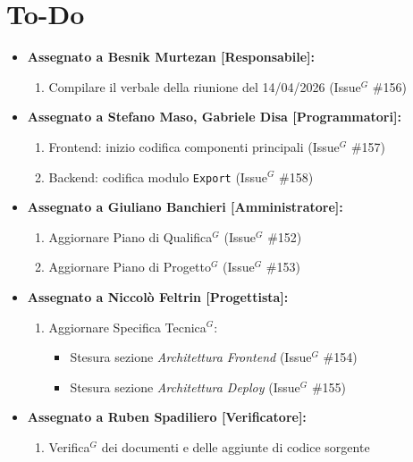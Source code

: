 \documentclass[a4paper,10pt]{article}
\begin{document}
\section*{To-Do}
\begin{itemize}
\item \textbf{Assegnato a Besnik Murtezan [Responsabile]:}
    \begin{enumerate}
    \item Compilare il verbale della riunione del 14/04/2026 (Issue$^G$ \#156)
    \end{enumerate}
\item \textbf{Assegnato a Stefano Maso, Gabriele Disa [Programmatori]:}
    \begin{enumerate}
    \item Frontend: inizio codifica componenti principali (Issue$^G$ \#157)
    \item Backend: codifica modulo \texttt{Export} (Issue$^G$ \#158)
  \end{enumerate}
\item \textbf{Assegnato a Giuliano Banchieri [Amministratore]:}
    \begin{enumerate}
    \item Aggiornare Piano di Qualifica$^G$ (Issue$^G$ \#152)
    \item Aggiornare Piano di Progetto$^G$ (Issue$^G$ \#153)
    \end{enumerate}
\item \textbf{Assegnato a Niccolò Feltrin [Progettista]:}
    \begin{enumerate}
    \item Aggiornare Specifica Tecnica$^G$:
      \begin{itemize}
        \item Stesura sezione \textit{Architettura Frontend} (Issue$^G$ \#154)
        \item Stesura sezione \textit{Architettura Deploy} (Issue$^G$ \#155)
      \end{itemize}
    \end{enumerate}
\item \textbf{Assegnato a Ruben Spadiliero [Verificatore]:}
    \begin{enumerate}
    \item Verifica$^G$ dei documenti e delle aggiunte di codice sorgente
    \end{enumerate}
\end{itemize}
\end{document}
